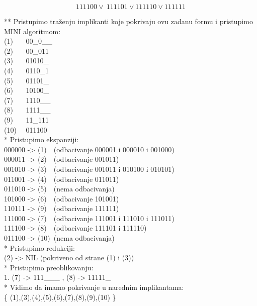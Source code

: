 \documentclass[12pt]{article}
\begin{document}
\begin{enumerate}
\begin{equation*}
		    111100 \vee~111101 \vee 111110 \vee 111111
		
		 \end{equation*}
		\newpage
		
		** Pristupimo traženju implikanti koje pokrivaju ovu zadanu formu i pristupimo MINI algoritmom: \\
		
		(1)~~~ 00\_0\_\_ \\
		(2)~~~ 00\_011 \\
		(3)~~~ 01010\_ \\
		(4)~~~ 0110\_1 \\
		(5)~~~ 01101\_ \\
		(6)~~~ 10100\_ \\
		(7)~~~ 1110\_\_ \\
		(8)~~~ 1111\_\_ \\
		(9)~~~ 11\_111 \\
		(10)~~ 011100 \\
		
		* Pristupimo ekspanziji: \\
		000000 -> (1)~~(odbacivanje 000001 i 000010 i 001000) \\
		000011 -> (2)~~(odbacivanje 001011) \\
		001010 -> (3)~~(odbacivanje 001011 i 010100 i 010101) \\
		011001 -> (4)~~(odbacivanje 011011) \\
		011010 -> (5)~~(nema odbacivanja) \\
		101000 -> (6)~~(odbacivanje 101001) \\
		110111 -> (9)~~(odbacivanje 111111) \\
		111000 -> (7)~~(odbacivanje 111001 i 111010 i 111011) \\
		111100 -> (8)~~(odbacivanje 111101 i 111110) \\
		011100 -> (10)~(nema odbacivanja) \\
		
		* Pristupimo redukciji: \\
		(2) -> NIL (pokriveno od strane (1) i (3)) \\
		
		* Pristupimo preoblikovanju: \\
		1. (7) -> 111\_\_\_ , (8) -> 11111\_ \\
		
		* Vidimo da imamo pokrivanje u narednim implikantama: \\
		\{ (1),(3),(4),(5),(6),(7),(8),(9),(10) \} \\
		

\end{enumerate}
\end{document}

